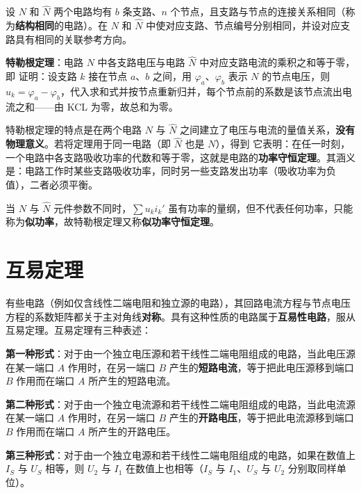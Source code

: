 设 $N$ 和 $\hat{N}$ 两个电路均有 $b$ 条支路、$n$ 个节点，且支路与节点的连接关系相同（称为\textbf{结构相同}的电路）。在 $N$ 和 $\hat{N}$ 中使对应支路、节点编号分别相同，并设对应支路具有相同的关联参考方向。

\textbf{特勒根定理}：电路 $N$ 中各支路电压与电路 $\hat{N}$ 中对应支路电流的乘积之和等于零，即
证明：设支路 $k$ 接在节点 $a$、$b$ 之间，用 $\varphi_a$、$\varphi_b$ 表示 $N$ 的节点电压，则 $u_k=\varphi_a-\varphi_b$，代入求和式并按节点重新归并，每个节点前的系数是该节点流出电流之和——由 KCL 为零，故总和为零。

特勒根定理的特点是在两个电路 $N$ 与 $\hat{N}$ 之间建立了电压与电流的量值关系，\textbf{没有物理意义}。若将定理用于同一电路（即 $\hat{N}$ 也是 $N$），得到
它表明：在任一时刻，一个电路中各支路吸收功率的代数和等于零，这就是电路的\textbf{功率守恒定理}。其涵义是：电路工作时某些支路吸收功率，同时另一些支路发出功率（吸收功率为负值），二者必须平衡。

当 $N$ 与 $\hat{N}$ 元件参数不同时，$\sum u_ki_k'$ 虽有功率的量纲，但不代表任何功率，只能称为\textbf{似功率}，故特勒根定理又称\textbf{似功率守恒定理}。


\section{互易定理}
有些电路（例如仅含线性二端电阻和独立源的电路），其回路电流方程与节点电压方程的系数矩阵都关于主对角线\textbf{对称}。具有这种性质的电路属于\textbf{互易性电路}，服从互易定理。互易定理有三种表述：

\textbf{第一种形式}：对于由一个独立电压源和若干线性二端电阻组成的电路，当此电压源在某一端口 $A$ 作用时，在另一端口 $B$ 产生的\textbf{短路电流}，等于把此电压源移到端口 $B$ 作用而在端口 $A$ 所产生的短路电流。

\textbf{第二种形式}：对于由一个独立电流源和若干线性二端电阻组成的电路，当此电流源在某一端口 $A$ 作用时，在另一端口 $B$ 产生的\textbf{开路电压}，等于把此电流源移到端口 $B$ 作用而在端口 $A$ 所产生的开路电压。

\textbf{第三种形式}：对于由一个独立电源和若干线性二端电阻组成的电路，如果在数值上 $I_S$ 与 $U_S$ 相等，则 $U_2$ 与 $I_1$ 在数值上也相等（$I_S$ 与 $I_1$、$U_S$ 与 $U_2$ 分别取同样单位）。

